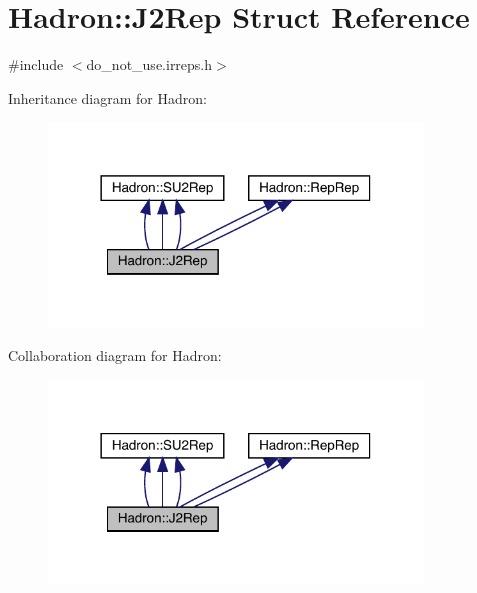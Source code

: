 \hypertarget{structHadron_1_1J2Rep}{}\section{Hadron\+:\+:J2\+Rep Struct Reference}
\label{structHadron_1_1J2Rep}


{\ttfamily \#include $<$do\+\_\+not\+\_\+use.\+irreps.\+h$>$}



Inheritance diagram for Hadron\+:
\nopagebreak
\begin{figure}[H]
\begin{center}
\leavevmode
\includegraphics[width=282pt]{d9/d08/structHadron_1_1J2Rep__inherit__graph}
\end{center}
\end{figure}


Collaboration diagram for Hadron\+:
\nopagebreak
\begin{figure}[H]
\begin{center}
\leavevmode
\includegraphics[width=282pt]{d5/d39/structHadron_1_1J2Rep__coll__graph}
\end{center}
\end{figure}
